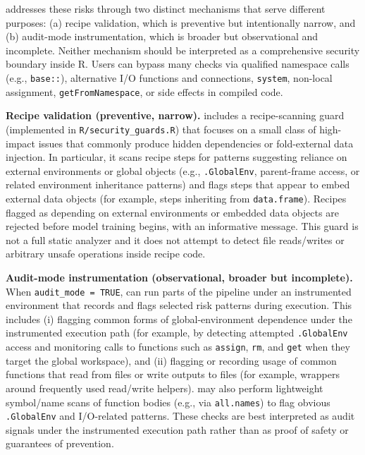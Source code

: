  addresses these risks through two distinct mechanisms that serve different purposes: (a) recipe validation, which is preventive but intentionally narrow, and (b) audit-mode instrumentation, which is broader but observational and incomplete. Neither mechanism should be interpreted as a comprehensive security boundary inside R. Users can bypass many checks via qualified namespace calls (e.g., \texttt{base::}), alternative I/O functions and connections, \texttt{system}, non-local assignment, \texttt{getFromNamespace}, or side effects in compiled code.

\textbf{Recipe validation (preventive, narrow).}
 includes a recipe-scanning guard (implemented in \texttt{R/security\_guards.R}) that focuses on a small class of high-impact issues that commonly produce hidden dependencies or fold-external data injection. In particular, it scans recipe steps for patterns suggesting reliance on external environments or global objects (e.g., \texttt{.GlobalEnv}, parent-frame access, or related environment inheritance patterns) and flags steps that appear to embed external data objects (for example, steps inheriting from \texttt{data.frame}). Recipes flagged as depending on external environments or embedded data objects are rejected before model training begins, with an informative message. This guard is not a full static analyzer and it does not attempt to detect file reads/writes or arbitrary unsafe operations inside recipe code.

\textbf{Audit-mode instrumentation (observational, broader but incomplete).}
When \texttt{audit\_mode\ =\ TRUE},  can run parts of the pipeline under an instrumented environment that records and flags selected risk patterns during execution. This includes (i) flagging common forms of global-environment dependence under the instrumented execution path (for example, by detecting attempted \texttt{.GlobalEnv} access and monitoring calls to functions such as \texttt{assign}, \texttt{rm}, and \texttt{get} when they target the global workspace), and (ii) flagging or recording usage of common functions that read from files or write outputs to files (for example, wrappers around frequently used read/write helpers).  may also perform lightweight symbol/name scans of function bodies (e.g., via \texttt{all.names}) to flag obvious \texttt{.GlobalEnv} and I/O-related patterns. These checks are best interpreted as audit signals under the instrumented execution path rather than as proof of safety or guarantees of prevention.

